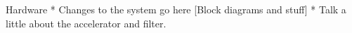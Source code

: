 \begin{block}{Hardware}
* Changes to the system go here [Block diagrams and stuff]
* Talk a little about the accelerator and filter.
\end{block}
